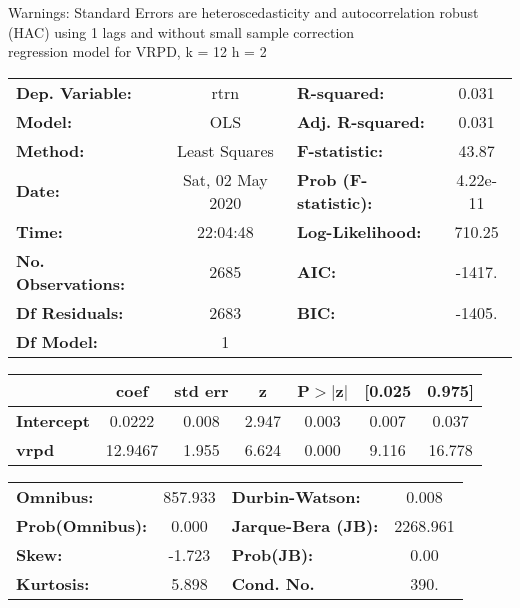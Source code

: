 Warnings: \newline
 [1] Standard Errors are heteroscedasticity and autocorrelation robust (HAC) using 1 lags and without small sample correction\\ 

regression model for VRPD, k = 12 h = 2\begin{center}
\begin{tabular}{lclc}
\toprule
\textbf{Dep. Variable:}    &       rtrn       & \textbf{  R-squared:         } &     0.031   \\
\textbf{Model:}            &       OLS        & \textbf{  Adj. R-squared:    } &     0.031   \\
\textbf{Method:}           &  Least Squares   & \textbf{  F-statistic:       } &     43.87   \\
\textbf{Date:}             & Sat, 02 May 2020 & \textbf{  Prob (F-statistic):} &  4.22e-11   \\
\textbf{Time:}             &     22:04:48     & \textbf{  Log-Likelihood:    } &    710.25   \\
\textbf{No. Observations:} &        2685      & \textbf{  AIC:               } &    -1417.   \\
\textbf{Df Residuals:}     &        2683      & \textbf{  BIC:               } &    -1405.   \\
\textbf{Df Model:}         &           1      & \textbf{                     } &             \\
\bottomrule
\end{tabular}
\begin{tabular}{lcccccc}
                   & \textbf{coef} & \textbf{std err} & \textbf{z} & \textbf{P$> |$z$|$} & \textbf{[0.025} & \textbf{0.975]}  \\
\midrule
\textbf{Intercept} &       0.0222  &        0.008     &     2.947  &         0.003        &        0.007    &        0.037     \\
\textbf{vrpd}      &      12.9467  &        1.955     &     6.624  &         0.000        &        9.116    &       16.778     \\
\bottomrule
\end{tabular}
\begin{tabular}{lclc}
\textbf{Omnibus:}       & 857.933 & \textbf{  Durbin-Watson:     } &    0.008  \\
\textbf{Prob(Omnibus):} &   0.000 & \textbf{  Jarque-Bera (JB):  } & 2268.961  \\
\textbf{Skew:}          &  -1.723 & \textbf{  Prob(JB):          } &     0.00  \\
\textbf{Kurtosis:}      &   5.898 & \textbf{  Cond. No.          } &     390.  \\
\bottomrule
\end{tabular}
\end{center}

